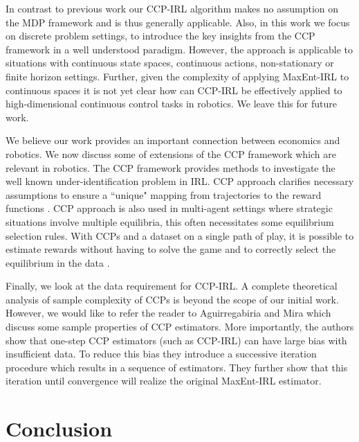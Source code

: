 \documentclass{article}
\begin{document}
In contrast to previous work our CCP-IRL algorithm makes no assumption on the MDP framework and is thus generally applicable.
Also, in this work we focus on discrete problem settings, to introduce the key insights from the CCP framework in a well understood paradigm.
However, the approach is applicable to situations with continuous state spaces, continuous actions, non-stationary or finite horizon settings.
Further, given the complexity of applying MaxEnt-IRL to continuous spaces it is not yet clear how can CCP-IRL be effectively applied to high-dimensional continuous control tasks in robotics. We leave this for future work. 


We believe our work provides an important connection between economics and robotics.
We now discuss some of extensions of the CCP framework which are relevant in robotics.  
The CCP framework provides methods to investigate the well known under-identification problem in IRL. CCP approach clarifies necessary assumptions to ensure a ``unique" mapping from trajectories to the reward functions \cite{magnac}. CCP approach is also used in multi-agent settings where strategic situations involve multiple equilibria, this often necessitates some equilibrium selection rules. With CCPs and a dataset on a single path of play, it is possible to estimate rewards without having to solve the game and to correctly select the equilibrium in the data \cite{pese}.

Finally, we look at the data requirement for CCP-IRL. A complete theoretical analysis of sample complexity of CCPs is beyond the scope of our initial work. However, we would like to refer the reader to Aguirregabiria and Mira  which discuss some sample properties of CCP estimators.
More importantly, the authors show that one-step CCP estimators (such as CCP-IRL) can have large bias with insufficient data. 
To reduce this bias they introduce a successive iteration procedure which results in a sequence of estimators. They further show that this iteration until convergence will realize the original MaxEnt-IRL estimator.

\section{Conclusion}
\end{document}
